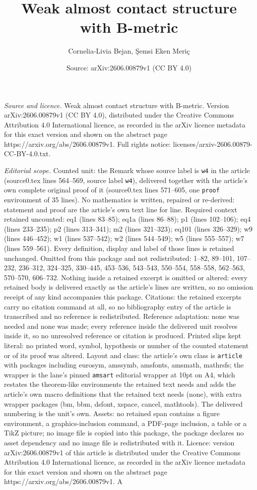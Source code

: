 \documentclass[10pt,a4paper]{amsart}
\title[Weak almost contact structure with B-metric]{Weak almost contact structure with B-metric}
\author{Cornelia-Livia Bejan, \c{S}emsi Eken Meri\c{c}}
\date{Source: arXiv:2606.00879v1 (CC BY 4.0)}
\begin{document}
\maketitle

\noindent\emph{Source and licence.} Weak almost contact structure with B-metric. Version arXiv:2606.00879v1 (CC BY 4.0), distributed under the Creative Commons Attribution 4.0 International licence, as recorded in the arXiv licence metadata for this exact version and shown on the abstract page https://arxiv.org/abs/2606.00879v1. Full rights notice: licenses/arxiv-2606.00879-CC-BY-4.0.txt.\par\smallskip

\noindent\textit{Editorial scope.} Counted unit: the Remark whose source label is \texttt{w4} in the article (source0.tex lines 564--569, source label \texttt{w4}), delivered together with the article's own complete original proof of it (source0.tex lines 571--605, one \texttt{proof} environment of 35 lines). No mathematics is written, repaired or re-derived: statement and proof are the article's own text line for line. Required context retained uncounted: eq1 (lines 83--85); eq1a (lines 86--88); p1 (lines 102--106); eq4 (lines 233--235); p2 (lines 313--341); m2 (lines 321--323); eq101 (lines 326--329); w9 (lines 446--452); w1 (lines 537--542); w2 (lines 544--549); w5 (lines 555--557); w7 (lines 559--561). Every definition, display and label of those lines is retained unchanged. Omitted from this package and not redistributed: 1--82, 89--101, 107--232, 236--312, 324--325, 330--445, 453--536, 543--543, 550--554, 558--558, 562--563, 570--570, 606--732. Nothing inside a retained excerpt is omitted or altered: every retained body is delivered exactly as the article's lines are written, so no omission receipt of any kind accompanies this package. Citations: the retained excerpts carry no citation command at all, so no bibliography entry of the article is transcribed and no reference is redistributed. Reference adaptation: none was needed and none was made; every reference inside the delivered unit resolves inside it, so no unresolved reference or citation is produced. Printed slips kept literal: no printed word, symbol, hypothesis or number of the counted statement or of its proof was altered. Layout and class: the article's own class is \texttt{article} with packages including eurosym, amssymb, amsfonts, amsmath, mathrsfs; the wrapper is the lane's pinned \texttt{amsart} editorial wrapper at 10pt on A4, which restates the theorem-like environments the retained text needs and adds the article's own macro definitions that the retained text needs (none), with extra wrapper packages (bm, bbm, dsfont, xspace, cancel, mathtools). The delivered numbering is the unit's own. Assets: no retained span contains a figure environment, a graphics-inclusion command, a PDF-page inclusion, a table or a TikZ picture; no image file is copied into this package, the package declares no asset dependency and no image file is redistributed with it. Licence: version arXiv:2606.00879v1 of this article is distributed under the Creative Commons Attribution 4.0 International licence, as recorded in the arXiv licence metadata for this exact version and shown on the abstract page https://arxiv.org/abs/2606.00879v1. A 
\end{document}
